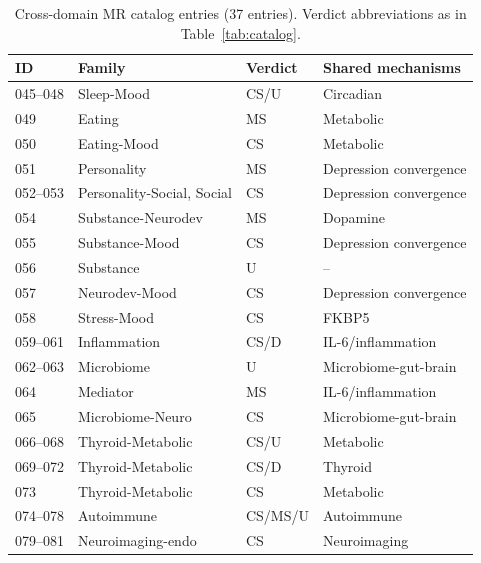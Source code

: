 \documentclass[11pt]{article}
\begin{document}
\begin{table}[h]
\centering
\caption{Cross-domain MR catalog entries (37 entries). Verdict abbreviations as in Table~\ref{tab:catalog}.}
\label{tab:expanded}
\footnotesize
\begin{tabular}{llll}
\toprule
ID & Family & Verdict & Shared mechanisms \\
\midrule
045--048 & Sleep-Mood & CS/U & Circadian \\
049 & Eating & MS & Metabolic \\
050 & Eating-Mood & CS & Metabolic \\
051 & Personality & MS & Depression convergence \\
052--053 & Personality-Social, Social & CS & Depression convergence \\
054 & Substance-Neurodev & MS & Dopamine \\
055 & Substance-Mood & CS & Depression convergence \\
056 & Substance & U & -- \\
057 & Neurodev-Mood & CS & Depression convergence \\
058 & Stress-Mood & CS & FKBP5 \\
059--061 & Inflammation & CS/D & IL-6/inflammation \\
062--063 & Microbiome & U & Microbiome-gut-brain \\
064 & Mediator & MS & IL-6/inflammation \\
065 & Microbiome-Neuro & CS & Microbiome-gut-brain \\
066--068 & Thyroid-Metabolic & CS/U & Metabolic \\
069--072 & Thyroid-Metabolic & CS/D & Thyroid \\
073 & Thyroid-Metabolic & CS & Metabolic \\
074--078 & Autoimmune & CS/MS/U & Autoimmune \\
079--081 & Neuroimaging-endo & CS & Neuroimaging \\
\bottomrule
\end{tabular}
\end{table}
\end{document}
